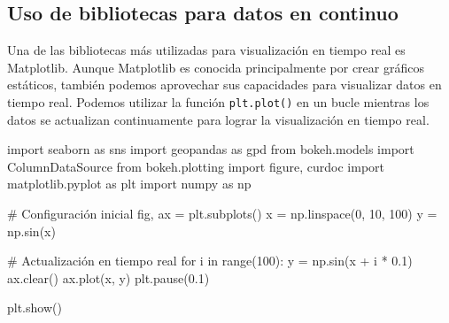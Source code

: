 \documentclass[
  a4paper,
]{article}
\newenvironment{Shaded}{}{}
\newcommand{\BuiltInTok}[1]{\textcolor[rgb]{0.84,0.23,0.29}{#1}}
\newcommand{\CommentTok}[1]{\textcolor[rgb]{0.42,0.45,0.49}{#1}}
\newcommand{\ControlFlowTok}[1]{\textcolor[rgb]{0.84,0.23,0.29}{#1}}
\newcommand{\DecValTok}[1]{\textcolor[rgb]{0.00,0.36,0.77}{#1}}
\newcommand{\FloatTok}[1]{\textcolor[rgb]{0.00,0.36,0.77}{#1}}
\newcommand{\ImportTok}[1]{\textcolor[rgb]{0.01,0.18,0.38}{#1}}
\newcommand{\KeywordTok}[1]{\textcolor[rgb]{0.84,0.23,0.29}{#1}}
\newcommand{\NormalTok}[1]{\textcolor[rgb]{0.14,0.16,0.18}{#1}}
\newcommand{\OperatorTok}[1]{\textcolor[rgb]{0.14,0.16,0.18}{#1}}
\begin{document}
\hypertarget{uso-de-bibliotecas-para-datos-en-continuo}{%
\subsection{Uso de bibliotecas para datos en
continuo}\label{uso-de-bibliotecas-para-datos-en-continuo}}

Una de las bibliotecas más utilizadas para visualización en tiempo real
es Matplotlib. Aunque Matplotlib es conocida principalmente por crear
gráficos estáticos, también podemos aprovechar sus capacidades para
visualizar datos en tiempo real. Podemos utilizar la función
\texttt{plt.plot()} en un bucle mientras los datos se actualizan
continuamente para lograr la visualización en tiempo real.

\begin{Shaded}
\begin{Highlighting}[]
\ImportTok{import}\NormalTok{ seaborn }\ImportTok{as}\NormalTok{ sns}
\ImportTok{import}\NormalTok{ geopandas }\ImportTok{as}\NormalTok{ gpd}
\ImportTok{from}\NormalTok{ bokeh.models }\ImportTok{import}\NormalTok{ ColumnDataSource}
\ImportTok{from}\NormalTok{ bokeh.plotting }\ImportTok{import}\NormalTok{ figure, curdoc}
\ImportTok{import}\NormalTok{ matplotlib.pyplot }\ImportTok{as}\NormalTok{ plt}
\ImportTok{import}\NormalTok{ numpy }\ImportTok{as}\NormalTok{ np}

\CommentTok{\# Configuración inicial}
\NormalTok{fig, ax }\OperatorTok{=}\NormalTok{ plt.subplots()}
\NormalTok{x }\OperatorTok{=}\NormalTok{ np.linspace(}\DecValTok{0}\NormalTok{, }\DecValTok{10}\NormalTok{, }\DecValTok{100}\NormalTok{)}
\NormalTok{y }\OperatorTok{=}\NormalTok{ np.sin(x)}

\CommentTok{\# Actualización en tiempo real}
\ControlFlowTok{for}\NormalTok{ i }\KeywordTok{in} \BuiltInTok{range}\NormalTok{(}\DecValTok{100}\NormalTok{):}
\NormalTok{    y }\OperatorTok{=}\NormalTok{ np.sin(x }\OperatorTok{+}\NormalTok{ i }\OperatorTok{*} \FloatTok{0.1}\NormalTok{)}
\NormalTok{    ax.clear()}
\NormalTok{    ax.plot(x, y)}
\NormalTok{    plt.pause(}\FloatTok{0.1}\NormalTok{)}

\NormalTok{plt.show()}
\end{Highlighting}
\end{Shaded}
\end{document}
